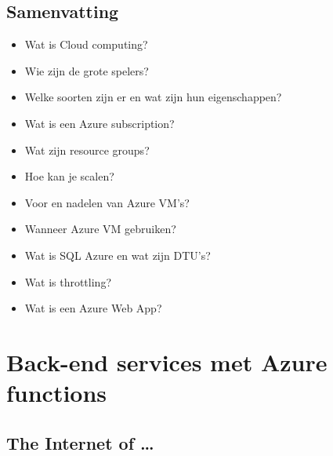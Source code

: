 \documentclass{article}
\begin{document}
\subsection{Samenvatting}
\begin{itemize}
    \item Wat is Cloud computing?
    \item Wie zijn de grote spelers?
    \item Welke soorten zijn er en wat zijn hun eigenschappen?
    \item Wat is een Azure subscription?
    \item Wat zijn resource groups?
    \item Hoe kan je scalen?
    \item Voor en nadelen van Azure VM’s?
    \item Wanneer Azure VM gebruiken?
    \item Wat is SQL Azure en wat zijn DTU’s?
    \item Wat is throttling?
    \item Wat is een Azure Web App?
\end{itemize}

\section{Back-end services met Azure functions}

\subsection{The Internet of \dots}
\end{document}
